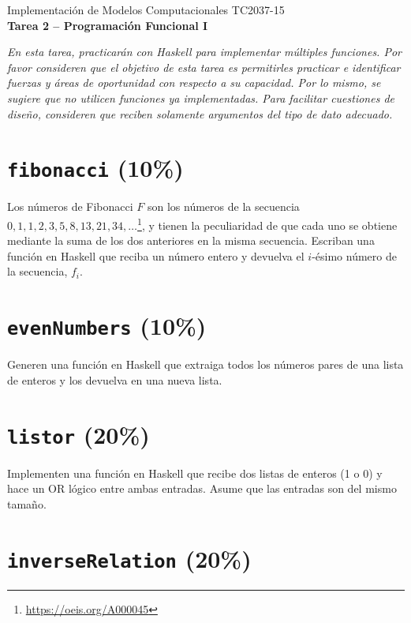 \documentclass[]{article}
\theoremstyle{definition}
\begin{document}
\begin{center}
{\huge Implementación de Modelos Computacionales TC2037-15}\\[1.5ex]
{\large \textbf{Tarea 2 -- Programación Funcional I}\\[1.5ex] %
} %
\end{center}

\vspace{0.2 cm}

{\footnotesize \textit{En esta tarea, practicarán con Haskell para implementar múltiples funciones. Por favor consideren que el objetivo de esta tarea es permitirles practicar e identificar fuerzas y áreas de oportunidad con respecto a su capacidad. Por lo mismo, se sugiere que no utilicen funciones ya implementadas. Para facilitar cuestiones de diseño, consideren que reciben solamente argumentos del tipo de dato adecuado.}}

\section{\texttt{fibonacci} (10\%)}

Los números de Fibonacci $F$ son los números de la secuencia $0, 1, 1, 2, 3, 5, 8, 13, 21, 34, \dots$\footnote{\url{https://oeis.org/A000045}}, y tienen la peculiaridad de que cada uno se obtiene mediante la suma de los dos anteriores en la misma secuencia. Escriban una función en Haskell que reciba un número entero y devuelva el $i$-ésimo número de la secuencia, $f_i$.

\section{\texttt{evenNumbers} (10\%)}

Generen una función en Haskell que extraiga todos los números pares de una lista de enteros y los devuelva en una nueva lista.

\section{\texttt{listor} (20\%)}

Implementen una función en Haskell que recibe dos listas de enteros (1 o 0) y hace un OR lógico entre ambas entradas. Asume que las entradas son del mismo tamaño.

\section{\texttt{inverseRelation} (20\%)}
\end{document}
